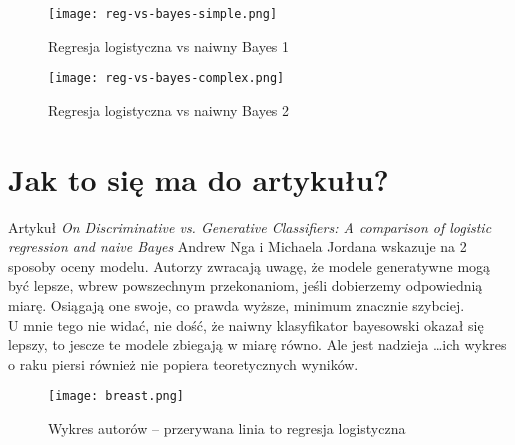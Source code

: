 \documentclass[a4paper,12pt]{article}
\begin{document}
\begin{figure}[H]
    \centering
    \texttt{[image: reg-vs-bayes-simple.png]}
    \caption{Regresja logistyczna vs naiwny Bayes 1}
    \label{fig:reg-vs-bayes-simple}
\end{figure}
\begin{figure}[H]
    \centering
    \texttt{[image: reg-vs-bayes-complex.png]}
    \caption{Regresja logistyczna vs naiwny Bayes 2}
    \label{fig:reg-vs-bayes-complex}
\end{figure}

\section{Jak to się ma do artykułu?}
Artykuł \textit{On Discriminative vs. Generative Classifiers: A comparison
of logistic regression and naive Bayes} Andrew Nga i Michaela Jordana wskazuje na 2 sposoby oceny modelu. Autorzy zwracają uwagę, że modele generatywne mogą być lepsze, wbrew powszechnym przekonaniom, jeśli dobierzemy odpowiednią miarę. Osiągają one swoje, co prawda wyższe, minimum znacznie szybciej. \\
U mnie tego nie widać, nie dość, że naiwny klasyfikator bayesowski okazał się lepszy, to jescze te modele zbiegają w miarę równo. Ale jest nadzieja \dots ich wykres o raku piersi również nie popiera teoretycznych wyników.
\begin{figure}[H]
    \centering
    \texttt{[image: breast.png]}
    \caption{Wykres autorów -- przerywana linia to regresja logistyczna}
    \label{fig:breast}
\end{figure}

% 
\end{document}
